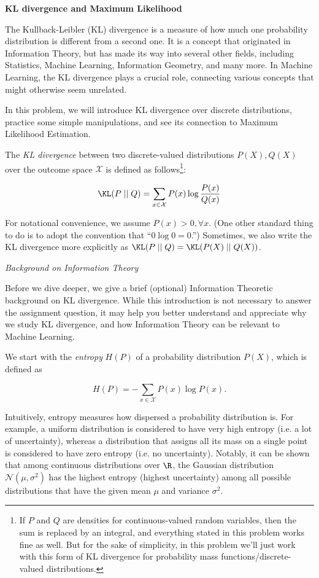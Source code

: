 \item {\bf KL divergence and Maximum Likelihood}

The Kullback-Leibler (KL) divergence is a measure of how much
one probability distribution is different from a second one. It is a concept that originated in Information Theory, but has made its
way into several other fields, including Statistics, Machine Learning,
Information Geometry, and many more. In Machine Learning, the KL
divergence plays a crucial role, connecting various concepts
that might otherwise seem unrelated.

In this problem, we will introduce KL divergence over discrete
distributions, practice some simple manipulations, and see its
connection to Maximum Likelihood Estimation.

The \emph{KL divergence} between two discrete-valued
distributions $P(X), Q(X)$  over the outcome space $\mathcal{X}$ is defined as follows\footnote{If $P$ and $Q$ are densities for continuous-valued random variables, then the sum is replaced by an integral, and everything stated in this problem works fine as well.  But for the sake of simplicity, in this problem we'll just work with this form of KL divergence for probability mass functions/discrete-valued distributions.}:

$$\KL(P\mid \mid Q) = \sum_{x \in \mathcal{X}}P(x)\log\frac{P(x)}{Q(x)}$$

For notational convenience, we assume $P(x)>0, \forall x$.
(One other standard thing to do is to adopt the convention that
``$0 \log 0 = 0$.'')  Sometimes, we also write the KL divergence more explicitly as
$\KL(P\mid \mid Q) = \KL(P(X)\mid \mid Q(X))$.

\emph{Background on Information Theory}

Before we dive deeper, we give a brief (optional) Information Theoretic
background on KL divergence. While this introduction is not necessary
to answer the assignment question, it may help you better understand
and appreciate why we study KL divergence, and how Information Theory
can be relevant to Machine Learning.

We start with the \emph{entropy} $H(P)$ of a probability distribution $P(X)$, which is defined as

$$ H(P) = -\sum_{x \in \mathcal{X}} P(x) \log P(x). $$

Intuitively, entropy measures how dispersed a probability
distribution is. For example, a uniform distribution is considered to have
very high entropy (i.e. a lot of uncertainty), whereas a distribution that assigns
all its mass on a single point is considered to have zero entropy (i.e. no uncertainty). Notably, it can be shown that among continuous distributions over $\R$, the Gaussian
distribution $\mathcal{N}(\mu,\sigma^2)$ has the highest entropy (highest uncertainty) among all possible distributions that have the given mean $\mu$ and variance $\sigma^2$.


